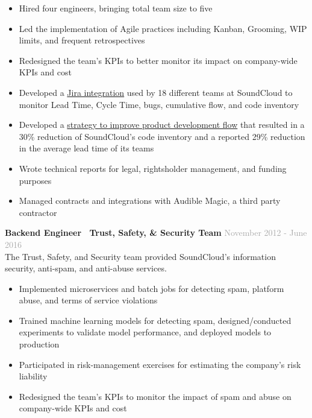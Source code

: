 \documentclass[margin,line]{res}
\newenvironment{list1}{
  \begin{list}{\ding{113}}{%
      \setlength{\itemsep}{0in}
      \setlength{\parsep}{0in} \setlength{\parskip}{0in}
      \setlength{\topsep}{0in} \setlength{\partopsep}{0in}
      \setlength{\leftmargin}{0.17in}}}{\end{list}}
\begin{document}
\begin{resume}
\begin{list1}
\begin{itemize}
\item Hired four engineers, bringing total team size to five
\item Led the implementation of Agile practices including Kanban, Grooming, WIP limits, and frequent retrospectives
\item Redesigned the team's KPIs to better monitor its impact on company-wide KPIs and cost
\item Developed a \href{https://github.com/soundcloud/project-dev-kpis}{Jira integration} used by 18 different teams at SoundCloud to monitor Lead Time, Cycle Time, bugs, cumulative flow, and code inventory
\item Developed a \href{https://developers.soundcloud.com/blog/deliver-software-faster-by-managing-work-in-progress-not-by-adding-overtime}{strategy to improve product development flow} that resulted in a 30\% reduction of SoundCloud's code inventory and a reported 29\% reduction in the average lead time of its teams
\item Wrote technical reports for legal, rightsholder management, and funding purposes
\item Managed contracts and integrations with Audible Magic, a third party contractor
\end{itemize}

\item[] {\bf Backend Engineer \textbar ~Trust, Safety, \& Security Team} \hfill \textcolor{darkgray}{November 2012 - June 2016} \vspace{1mm} \\
The Trust, Safety, and Security team provided SoundCloud's information security, anti-spam, and anti-abuse services.

\begin{itemize}
\item Implemented microservices and batch jobs for detecting spam, platform abuse, and terms of service violations
\item Trained machine learning models for detecting spam, designed/conducted experiments to validate model performance, and deployed models to production
\item Participated in risk-management exercises for estimating the company's risk liability
\item Redesigned the team's KPIs to monitor the impact of spam and abuse on company-wide KPIs and cost
\end{itemize}

\end{list1}


\end{resume}
\end{document}
